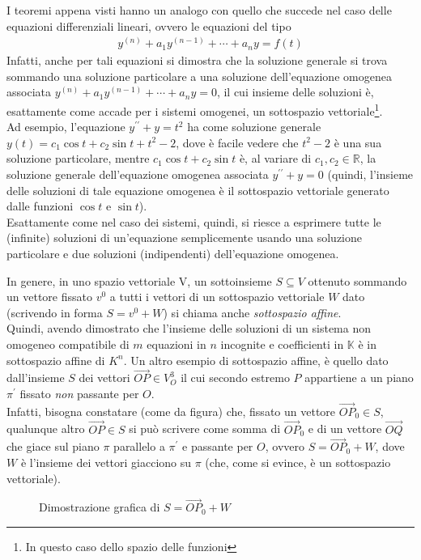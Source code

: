 \begin{oss}
  \label{oss:gauss-jordan2}
  I teoremi appena visti hanno un analogo con quello che succede nel caso delle equazioni
  differenziali lineari, ovvero le equazioni del tipo
  \begin{eqnarray*}
    y^{(n)}+a_1y^{(n-1)}+\cdots+a_ny=f(t)
  \end{eqnarray*}
  Infatti, anche per tali equazioni si dimostra che la soluzione generale si trova
  sommando una soluzione particolare a una soluzione dell'equazione omogenea associata
  $y^{(n)}+a_1y^{(n-1)}+\cdots+a_ny=0$, il cui insieme delle soluzioni è, esattamente come
  accade per i sistemi omogenei, un sottospazio vettoriale\footnote{In questo caso dello
    spazio delle funzioni}.\\
  Ad esempio, l'equazione $y^{\prime\prime}+y=t^2$ ha come soluzione generale
  $y(t)=c_1\cos t+ c_2\sin t+t^2-2$, dove è facile vedere che $t^2-2$ è una sua soluzione
  particolare, mentre $c_1\cos t +c_2\sin t$ è, al variare di $c_1,c_2\in \mathds{R}$, la
  soluzione generale dell'equazione omogenea associata $y^{\prime\prime}+y=0$ (quindi, l'insieme
  delle soluzioni di tale equazione omogenea è il sottospazio vettoriale generato dalle
  funzioni $\cos t$ e $\sin t$).\\
  Esattamente come nel caso dei sistemi, quindi, si riesce a esprimere tutte le (infinite) soluzioni
  di un'equazione semplicemente usando una soluzione particolare e due soluzioni (indipendenti)
  dell'equazione omogenea.
\end{oss}
In genere, in uno spazio vettoriale V, un sottoinsieme $S\subseteq V$ ottenuto sommando un vettore
fissato $v^0$ a tutti i vettori di un sottospazio vettoriale $W$ dato (scrivendo in forma $S=v^0+W$)
si chiama anche \textit{sottospazio affine}.\\
Quindi, avendo dimostrato che l'insieme delle soluzioni di un sistema non omogeneo compatibile di
$m$ equazioni in $n$ incognite e coefficienti in $\mathds{K}$ è in sottospazio affine di $K^n$.
Un altro esempio di sottospazio affine, è quello dato dall'insieme $S$ dei vettori $\vec{OP}\in V^3_O$
il cui secondo estremo $P$ appartiene a un piano $\pi^\prime$ fissato \textit{non} passante per $O$.\\
Infatti, bisogna constatare (come da figura) che, fissato un vettore $\vec{OP}_0\in S$, qualunque altro
$\vec{OP}\in S$ si può scrivere come somma di $\vec{OP}_0$ e di un vettore $\vec{OQ}$ che giace sul
piano $\pi$ parallelo a $\pi^\prime$ e passante per $O$, ovvero $S=\vec{OP}_0+W$, dove $W$ è l'insieme
dei vettori giacciono su $\pi$ (che, come si evince, è un sottospazio vettoriale).
\begin{figure}[ht!]
  \centering
  
  \caption{Dimostrazione grafica di $S=\vec{OP}_0+W$}
  \label{fig:OP0piuW}
\end{figure}

